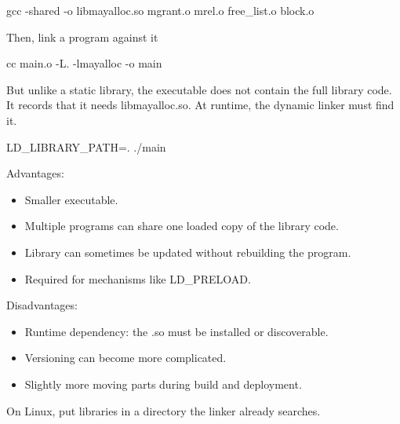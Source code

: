 \documentclass{report}
\begin{document}
\begin{itemize}
\begin{itemize}
\begin{bashcode}
                            gcc -shared -o libmayalloc.so mgrant.o mrel.o free_list.o block.o
                        \end{bashcode}
                        \bigbreak \noindent 
                        Then, link a program against it
                        \bigbreak \noindent 
                        \begin{bashcode}
                        cc main.o -L. -lmayalloc -o main
                        \end{bashcode}
                        \bigbreak \noindent 
                        But unlike a static library, the executable does not contain the full library code. It records that it needs libmayalloc.so.
                        \bigbreak \noindent 
                        At runtime, the dynamic linker must find it.
                        \bigbreak \noindent 
                        \begin{bashcode}
                            LD_LIBRARY_PATH=. ./main
                        \end{bashcode}
                        \bigbreak \noindent 
                        Advantages:
                        \begin{itemize}
                            \item Smaller executable.
                            \item Multiple programs can share one loaded copy of the library code.
                            \item Library can sometimes be updated without rebuilding the program.
                            \item Required for mechanisms like LD\_PRELOAD.
                        \end{itemize}
                        Disadvantages:
                        \begin{itemize}
                            \item Runtime dependency: the .so must be installed or discoverable.
                            \item Versioning can become more complicated.
                            \item Slightly more moving parts during build and deployment.
                        \end{itemize}
                \end{itemize}
                On Linux, put libraries in a directory the linker already searches.
                \bigbreak \noindent 
                \begin{bashcode}

\end{bashcode}
\end{itemize}
\end{document}
